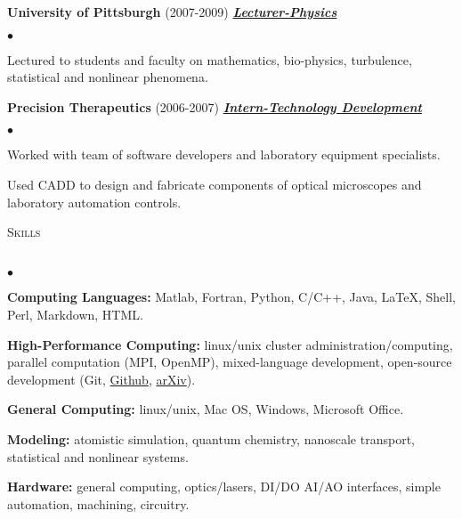 \documentclass{article}
\newcommand{\lineunder}{\vspace*{-8pt} \\ \hspace*{-18pt} \hrulefill \\}
\newcommand{\header}[1]{{\hspace*{-15pt}\vspace*{6pt} \textsc{#1}} \vspace*{-6pt} \lineunder}
\newcommand{\employer}[3]{{ \textbf{#1} (#2) \underline{\textbf{\emph{#3}}}\\  }}
\newenvironment{achievements}{\begin{list}{$\bullet$}{\topsep 0pt \itemsep -2pt}}{\vspace*{4pt}\end{list}}
\begin{document}
\employer{University of Pittsburgh}{2007-2009}{Lecturer-Physics}
	\begin{achievements}
	\item Lectured to students and faculty on mathematics, bio-physics, turbulence, statistical and nonlinear phenomena. 
	\end{achievements}

\employer{Precision Therapeutics}{2006-2007}{Intern-Technology Development}
	\begin{achievements}
	\item Worked with team of software developers and laboratory equipment specialists.
	\item Used CADD to design and fabricate components of optical microscopes and laboratory automation controls. 
	\end{achievements}

\header{Skills}
\begin{achievements}

\item \textbf{Computing Languages:} Matlab, Fortran, Python, C/C++, Java, \LaTeX, Shell, Perl, Markdown, HTML.

\item \textbf{High-Performance Computing:} linux/unix cluster administration/computing, parallel computation (MPI, OpenMP), mixed-language development, open-source development (Git, \href{http://github.com/jasonlarkin}{Github}, \href{http://arxiv.org/find/physics/1/au:+Larkin_J/0/1/0/all/0/1}{arXiv}).

\item \textbf{General Computing:} linux/unix, Mac OS, Windows, Microsoft Office.

\item \textbf{Modeling:} atomistic simulation, quantum chemistry, nanoscale transport, statistical and nonlinear systems.

\item \textbf{Hardware:} general computing, optics/lasers, DI/DO AI/AO interfaces, simple automation, machining, circuitry. 
\end{achievements}
\end{document}
